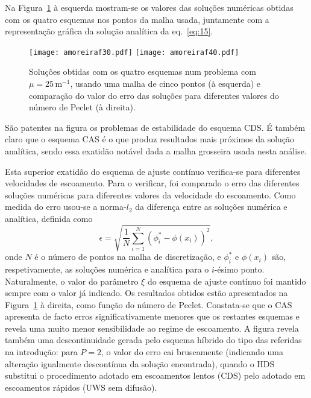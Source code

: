 \documentclass[11pt,twoside]{article}
\begin{document}
{Na Figura~\ref{fig:30} à esquerda mostram-se os valores das soluções numéricas obtidas com os quatro esquemas nos pontos da malha usada, juntamente com a representação gráfica da solução analítica da eq.~\eqref{eq:15}.
\begin{figure}[!h]
\centering
\texttt{[image: amoreiraf30.pdf]}\hfill
\texttt{[image: amoreiraf40.pdf]}
\caption{Soluções obtidas com os quatro esquemas num problema com $\mu=25\,\text{m}^{-1}$, usando uma malha de cinco pontos (à esquerda) e comparação do valor do erro das soluções para diferentes valores do número de Peclet (à direita).
\label{fig:30}}
\end{figure}
São patentes na figura os problemas de estabilidade do esquema CDS. É também
claro que o esquema CAS é o que produz resultados mais próximos da solução
analítica, sendo essa exatidão notável dada a malha grosseira usada nesta
análise.

Esta superior exatidão do esquema de ajuste contínuo verifica-se para diferentes
velocidades de escoamento. Para o verificar, foi comparado o erro das diferentes
soluções numéricas para diferentes valores da velocidade do escoamento. Como medida do
erro usou-se a norma-$l_2$ da diferença entre as soluções numérica e analítica,
definida como
\begin{equation}
    \epsilon = \sqrt{\frac{1}{N}\sum_{i=1}^N(\phi^*_i-\phi(x_i))^2},
\end{equation}
onde $N$ é o número de pontos na malha de discretização, e $\phi^*_i$ e
$\phi(x_i)$ são, respetivamente, as soluções numérica e analítica para o
$i$-ésimo ponto. Naturalmente, o valor do parâmetro $\xi$ do esquema de ajuste
contínuo foi mantido sempre com o valor já indicado. Os resultados obtidos estão apresentados na Figura~\ref{fig:30} à direita, como função do número de Peclet.
Constata-se que o CAS apresenta de facto erros significativamente menores que os
restantes esquemas e revela uma muito menor sensibilidade ao regime de
escoamento. A figura revela também uma descontinuidade gerada pelo esquema
híbrido do tipo das referidas na introdução: para $P=2$, o valor do erro cai
bruscamente (indicando uma alteração igualmente descontínua da solução encontrada), quando o HDS substitui o procedimento adotado em escoamentos lentos
(CDS) pelo adotado em escoamentos rápidos (UWS sem difusão).

}
\end{document}
